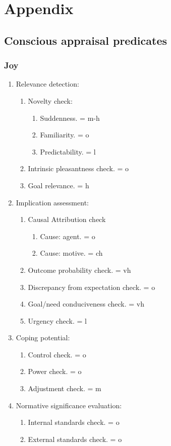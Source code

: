 {{\section{Appendix}

\subsection{Conscious appraisal predicates}

\subsubsection{Joy}

\begin{enumerate}
\item  Relevance detection:
\begin{enumerate}
\item  Novelty check:
\begin{enumerate}
\item  Suddenness. = m-h
\item  Familiarity. = o
\item  Predictability. = l
\end{enumerate}
\item  Intrinsic pleasantness check. = o
\item  Goal relevance. = h
\end{enumerate}
\item  Implication assessment:
\begin{enumerate}
\item  Causal Attribution check
\begin{enumerate}
\item  Cause: agent. = o
\item  Cause: motive. = ch
\end{enumerate}
\item  Outcome probability check. = vh
\item  Discrepancy from expectation check. = o
\item  Goal/need conduciveness check. = vh
\item  Urgency check. = l
\end{enumerate}
\item  Coping potential:
\begin{enumerate}
\item  Control check. = o
\item  Power check. = o
\item  Adjustment check. = m
\end{enumerate}
\item  Normative significance evaluation:
\begin{enumerate}
\item  Internal standards check. = o
\item  External standards check. = o
\end{enumerate}
\end{enumerate}

}}
